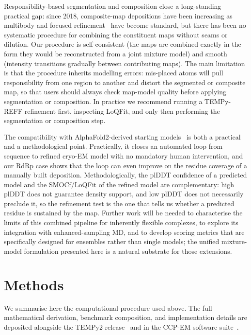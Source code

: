 \documentclass[11pt]{article}
\begin{document}
Responsibility-based segmentation and composition close a long-standing practical gap: since 2018, composite-map depositions have been increasing as multibody and focused refinement~\cite{nakane2018,scheres2012} have become standard, but there has been no systematic procedure for combining the constituent maps without seams or dilution. Our procedure is self-consistent (the maps are combined exactly in the form they would be reconstructed from a joint mixture model) and smooth (intensity transitions gradually between contributing maps). The main limitation is that the procedure inherits modelling errors: mis-placed atoms will pull responsibility from one region to another and distort the segmented or composite map, so that users should always check map-model quality before applying segmentation or composition. In practice we recommend running a TEMPy-REFF refinement first, inspecting LoQFit, and only then performing the segmentation or composition step.

The compatibility with AlphaFold2-derived starting models~\cite{jumper2021,baek2021} is both a practical and a methodological point. Practically, it closes an automated loop from sequence to refined cryo-EM model with no mandatory human intervention, and our RdRp case shows that the loop can even improve on the residue coverage of a manually built deposition. Methodologically, the plDDT confidence of a predicted model and the SMOCf/LoQFit of the refined model are complementary: high plDDT does not guarantee density support, and low plDDT does not necessarily preclude it, so the refinement test is the one that tells us whether a predicted residue is sustained by the map. Further work will be needed to characterise the limits of this combined pipeline for inherently flexible complexes, to explore its integration with enhanced-sampling MD, and to develop scoring metrics that are specifically designed for ensembles rather than single models; the unified mixture-model formulation presented here is a natural substrate for those extensions.

\section{Methods}
We summarise here the computational procedure used above. The full mathematical derivation, benchmark composition, and implementation details are deposited alongside the TEMPy2 release~\cite{farabella2015} and in the CCP-EM software suite~\cite{burnley2017}.
\end{document}
